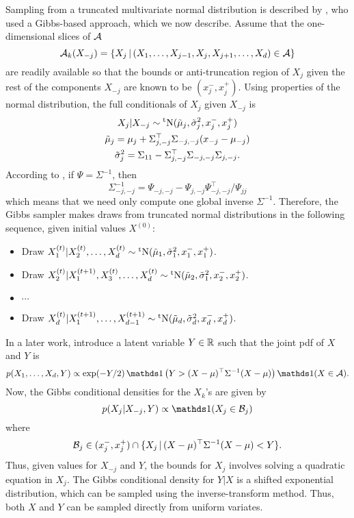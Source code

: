 Sampling from a truncated multivariate normal distribution is described by \citet{robert1995simulation}, who used a Gibbs-based approach, which we now describe.
Assume that the one-dimensional slices of ${\mathcal A}$ 
\[
  {\mathcal A}_k(X_{-j}) = \{X_j \,|\, (X_1,\dots,X_{j-1},X_j, X_{j+1},\dots,X_d) \in {\mathcal A} \}
\]
are readily available so that the bounds or anti-truncation region of $X_j$ given the rest of the components $X_{-j}$ are known to be $(x_j^-, x_j^+)$.
Using properties of the normal distribution, the full conditionals of $X_j$ given $X_{-j}$ is
\begin{gather*}
  X_j|X_{-j} \sim \operatorname{{}^tN}(\tilde\mu_j,\tilde\sigma_j^2, x_j^-, x_j^+) \\
  \tilde\mu_j = \mu_{j} + \Sigma_{j,-j}^\top\Sigma_{-j,-j}(x_{-j} - \mu_{-j}) \\
  \tilde\sigma_j^2 = \Sigma_{11} - \Sigma_{j,-j}^\top \Sigma_{-j,-j} \Sigma_{j,-j}.
\end{gather*}
According to \citet{robert1995simulation}, if $\Psi = \Sigma^{-1}$, then 
\[
  \Sigma_{-j,-j}^{-1} = \Psi_{-j,-j} - \Psi_{j,-j}\Psi_{-j,-j}^\top / \Psi_{jj}
\]
which means that we need only compute one global inverse $\Sigma^{-1}$.
Therefore, the Gibbs sampler makes draws from truncated normal distributions in the following sequence, given initial values $X^{(0)}$:
\begin{itemize}
  \item Draw $X^{(t)}_1|X^{(t)}_2,\dots,X^{(t)}_d \sim \operatorname{{}^tN}(\tilde\mu_1,\tilde\sigma_1^2, x_1^-, x_1^+)$.
  \item Draw $X^{(t)}_2|X^{(t+1)}_1,X^{(t)}_3,\dots,X^{(t)}_d \sim \operatorname{{}^tN}(\tilde\mu_2,\tilde\sigma_1^2, x_2^-, x_2^+)$.
  \item $\cdots$
  \item Draw $X^{(t)}_d|X^{(t+1)}_1,\dots,X^{(t+1)}_{d-1} \sim \operatorname{{}^tN}(\tilde\mu_d,\tilde\sigma_d^2, x_d^-, x_d^+)$.
\end{itemize}

In a later work, \citet{damien2001sampling} introduce a latent variable $Y \in \mathbb{R}$ such that the joint pdf of $X$ and $Y$ is
\[
  p(X_1,\dots,X_d,Y) \propto \exp(-Y/2) \ind\big( Y > (X-\mu)^\top\Sigma^{-1}(X-\mu)\big)\ind(X\in\cA).
\]
Now, the Gibbs conditional densities for the $X_k$'s are given by
\[
  p(X_j|X_{-j},Y) \propto \ind(X_j \in \cB_j)
\]
where
\[
  {\mathcal B}_j \in (x_j^-, x_j^+) \cap \{X_j \,|\, (X-\mu)^\top\Sigma^{-1}(X-\mu) < Y \}.
\]
Thus, given values for $X_{-j}$ and $Y$, the bounds for $X_j$ involves solving a quadratic equation in $X_j$.
The Gibbs conditional density for $Y|X$ is a shifted exponential distribution, which can be sampled using the inverse-transform method.
Thus, both $X$ and $Y$ can be sampled directly from uniform variates.

